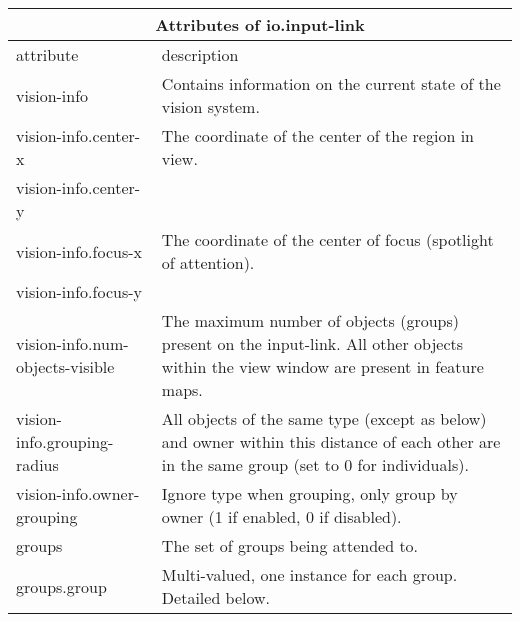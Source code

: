 \documentclass{report}
\begin{document}
\begin{center}
\begin{tabular}{|l|p{3.5in}|}
\hline
\multicolumn{2}{|c|}{\textbf{Attributes of io.input-link}}\\ 
\hline
attribute  &  description\\
\hline \hline
vision-info & Contains information on the current state of the vision system. \\
\hline
vision-info.center-x & The coordinate of the center of the region in view. \\
vision-info.center-y & \\
\hline
vision-info.focus-x & The coordinate of the center of focus (spotlight of attention). \\
vision-info.focus-y & \\
\hline
vision-info.num-objects-visible & The maximum number of objects (groups) present on the input-link. All other objects within the view window are present in feature maps. \\
\hline
vision-info.grouping-radius & All objects of the same type (except as below) and owner within this distance of each other are in the same group (set to 0 for individuals). \\
\hline
vision-info.owner-grouping & Ignore type when grouping, only group by owner (1 if enabled, 0 if disabled). \\
\hline
groups & The set of groups being attended to. \\
\hline
groups.group & Multi-valued, one instance for each group. Detailed below. \\
\hline
\end{tabular}


\end{center}
\end{document}
